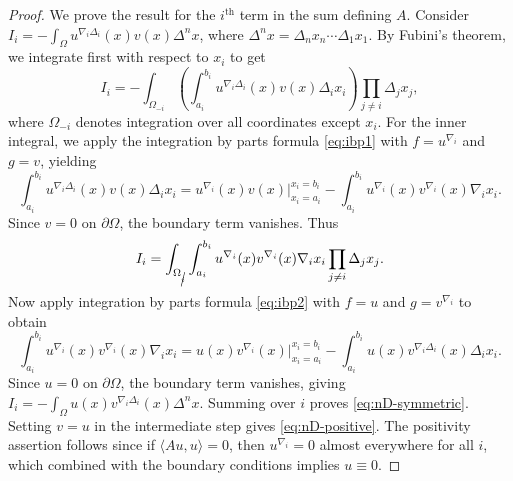 \documentclass{article}
\numberwithin{equation}{section}
\numberwithin{theorem}{section}
\begin{document}
\begin{proof}
We prove the result for the $i^{\text{th}}$ term in the sum defining $A$. Consider $I_i = -\displaystyle\int_{\Omega} u^{\nabla_i\Delta_i}(x) v(x) \Delta^n x$, where $\Delta^n x = \Delta_n x_n \cdots \Delta_1 x_1$. By Fubini's theorem, we integrate first with respect to $x_i$ to get
\[
I_i = -\int_{\Omega_{-i}} \left( \int_{a_i}^{b_i} u^{\nabla_i\Delta_i}(x) v(x) \Delta_i x_i \right) \prod_{j \neq i} \Delta_j x_j,
\]
where $\Omega_{-i}$ denotes integration over all coordinates except $x_i$.
For the inner integral, we apply the integration by parts formula \eqref{eq:ibp1} with $f = u^{\nabla_i}$ and $g = v$, yielding
\[
\int_{a_i}^{b_i} u^{\nabla_i\Delta_i}(x) v(x) \Delta_i x_i = u^{\nabla_i}(x) v(x) \Big|_{x_i=a_i}^{x_i=b_i} - \int_{a_i}^{b_i} u^{\nabla_i}(x) v^{\nabla_i}(x) \nabla_i x_i.
\]
Since $v = 0$ on $\partial\Omega$, the boundary term vanishes. Thus
\[
I_i = \int_{\Omega_{\cancel{i}}} \int_{a_i}^{b_i} u^{\nabla_i}(x) v^{\nabla_i}(x) \nabla_i x_i \prod_{j \neq i} \Delta_j x_j.
\]
Now apply integration by parts formula \eqref{eq:ibp2} with $f = u$ and $g = v^{\nabla_i}$ to obtain
\[
\int_{a_i}^{b_i} u^{\nabla_i}(x) v^{\nabla_i}(x) \nabla_i x_i = u(x) v^{\nabla_i}(x) \Big|_{x_i=a_i}^{x_i=b_i} - \int_{a_i}^{b_i} u(x) v^{\nabla_i\Delta_i}(x) \Delta_i x_i.
\]
Since $u = 0$ on $\partial\Omega$, the boundary term vanishes, giving $I_i = -\displaystyle\int_{\Omega} u(x) v^{\nabla_i\Delta_i}(x) \Delta^n x$. Summing over $i$ proves \eqref{eq:nD-symmetric}. Setting $v = u$ in the intermediate step gives \eqref{eq:nD-positive}. The positivity assertion follows since if $\langle Au, u \rangle = 0$, then $u^{\nabla_i} = 0$ almost everywhere for all $i$, which combined with the boundary conditions implies $u \equiv 0$.
\end{proof}
\end{document}
